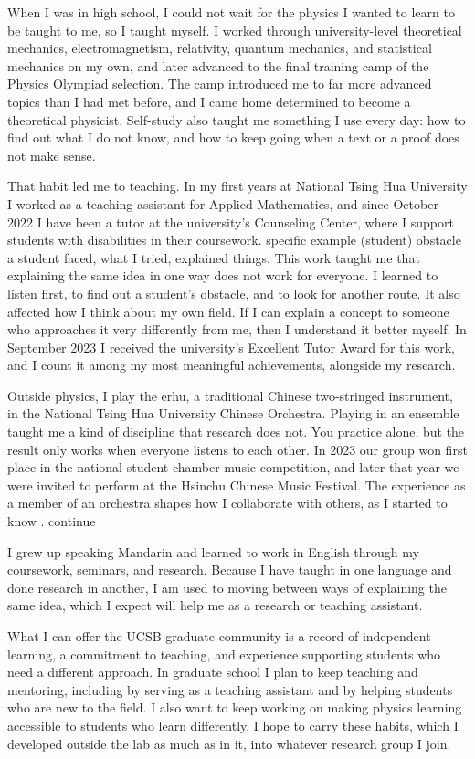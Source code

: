 When I was in high school, I could not wait for the physics I wanted to learn to be taught to me, so I taught myself. I worked through university-level theoretical mechanics, electromagnetism, relativity, quantum mechanics, and statistical mechanics on my own, and later advanced to the final training camp of the Physics Olympiad selection. The camp introduced me to far more advanced topics than I had met before, and I came home determined to become a theoretical physicist. Self-study also taught me something I use every day: how to find out what I do not know, and how to keep going when a text or a proof does not make sense.

That habit led me to teaching. In my first years at National Tsing Hua University I worked as a teaching assistant for Applied Mathematics, and since October 2022 I have been a tutor at the university's Counseling Center, where I support students with disabilities in their coursework. {\color{red} specific example (student) obstacle a student faced, what I tried, explained things.} This work taught me that explaining the same idea in one way does not work for everyone. I learned to listen first, to find out a student's obstacle, and to look for another route. It also affected how I think about my own field. If I can explain a concept to someone who approaches it very differently from me, then I understand it better myself. In September 2023 I received the university's Excellent Tutor Award for this work, and I count it among my most meaningful achievements, alongside my research.

Outside physics, I play the erhu, a traditional Chinese two-stringed instrument, in the National Tsing Hua University Chinese Orchestra. Playing in an ensemble taught me a kind of discipline that research does not. You practice alone, but the result only works when everyone listens to each other. In 2023 our group won first place in the national student chamber-music competition, and later that year we were invited to perform at the Hsinchu Chinese Music Festival. The experience as a member of an orchestra shapes how I collaborate with others, as I started to know .  {\color{red} continue}


I grew up speaking Mandarin and learned to work in English through my coursework, seminars, and research. Because I have taught in one language and done research in another, I am used to moving between ways of explaining the same idea, which I expect will help me as a research or teaching assistant.

What I can offer the UCSB graduate community is a record of independent learning, a commitment to teaching, and experience supporting students who need a different approach. In graduate school I plan to keep teaching and mentoring, including by serving as a teaching assistant and by helping students who are new to the field. I also want to keep working on making physics learning accessible to students who learn differently. I hope to carry these habits, which I developed outside the lab as much as in it, into whatever research group I join.